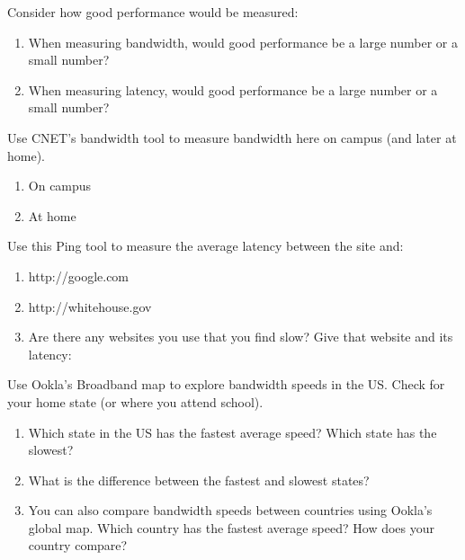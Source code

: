\documentclass[12pt]{article}
\begin{document}


\Q Consider how good performance would be measured:
\begin{enumerate}
\item When measuring bandwidth, would good performance be a large number or a small number?
\item When measuring latency, would good performance be a large number or a small number?
\end{enumerate}


\Q Use CNET’s bandwidth tool to measure bandwidth here on campus (and later at home).
\begin{enumerate}
\item On campus
\item At home
\end{enumerate}


\Q Use this Ping tool to measure the average latency between the site and:
\begin{enumerate}
\item http://google.com
\item http://whitehouse.gov
\item Are there any websites you use that you find slow? Give that website and its latency:
\end{enumerate}


\Q Use Ookla’s Broadband map to explore bandwidth speeds in the US. Check for your home state (or where you attend school).
\begin{enumerate}
\item Which state in the US has the fastest average speed? Which state has the slowest? 
\item What is the difference between the fastest and slowest states?
\item You can also compare bandwidth speeds between countries using Ookla’s global map.  Which country has the fastest average speed? How does your country compare?
\end{enumerate}
\end{document}
